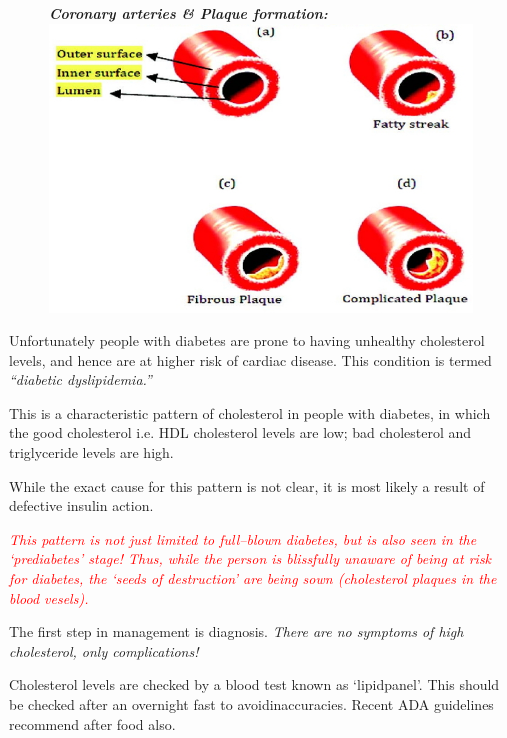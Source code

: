 \begin{figure}[h]
\centering
\textbf{\textit{Coronary arteries \& Plaque formation:}}\\
\includegraphics[scale=1.9]{images/044.jpg}
\end{figure}

Unfortunately people with diabetes are prone to having unhealthy cholesterol levels, and hence are at higher risk of cardiac disease. This condition is termed \textit{“diabetic dyslipidemia.”}


This is a characteristic pattern of cholesterol in people with diabetes, in which the good cholesterol i.e. HDL cholesterol levels are low; bad cholesterol and triglyceride levels are high.

While the exact cause for this pattern is not clear, it is most likely a result of defective insulin action.

\textcolor{red}{\textit{This pattern is not just limited to full–blown diabetes, but is also seen in the ‘prediabetes’ stage! Thus, while the person is blissfully unaware of being at risk for diabetes, the ‘seeds of destruction’ are being sown (cholesterol plaques in the blood vesels).}}


The first step in management is diagnosis. \textit{There are no symptoms of high cholesterol, only complications!}

Cholesterol levels are checked by a blood test known as ‘lipid\break panel’. This should be checked after an overnight fast to avoid\break inaccuracies. Recent ADA guidelines recommend after food also.

